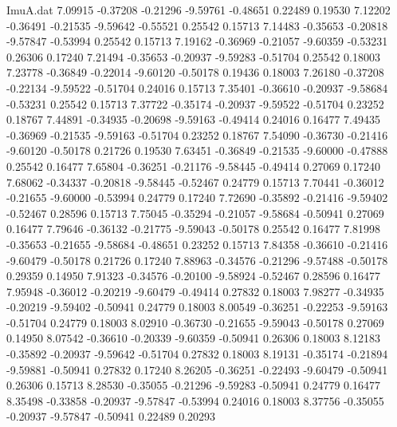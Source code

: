 \begin{filecontents}{ImuA.dat}
   7.09915   -0.37208   -0.21296   -9.59761   -0.48651    0.22489    0.19530
   7.12202   -0.36491   -0.21535   -9.59642   -0.55521    0.25542    0.15713
   7.14483   -0.35653   -0.20818   -9.57847   -0.53994    0.25542    0.15713
   7.19162   -0.36969   -0.21057   -9.60359   -0.53231    0.26306    0.17240
   7.21494   -0.35653   -0.20937   -9.59283   -0.51704    0.25542    0.18003
   7.23778   -0.36849   -0.22014   -9.60120   -0.50178    0.19436    0.18003
   7.26180   -0.37208   -0.22134   -9.59522   -0.51704    0.24016    0.15713
   7.35401   -0.36610   -0.20937   -9.58684   -0.53231    0.25542    0.15713
   7.37722   -0.35174   -0.20937   -9.59522   -0.51704    0.23252    0.18767
   7.44891   -0.34935   -0.20698   -9.59163   -0.49414    0.24016    0.16477
   7.49435   -0.36969   -0.21535   -9.59163   -0.51704    0.23252    0.18767
   7.54090   -0.36730   -0.21416   -9.60120   -0.50178    0.21726    0.19530
   7.63451   -0.36849   -0.21535   -9.60000   -0.47888    0.25542    0.16477
   7.65804   -0.36251   -0.21176   -9.58445   -0.49414    0.27069    0.17240
   7.68062   -0.34337   -0.20818   -9.58445   -0.52467    0.24779    0.15713
   7.70441   -0.36012   -0.21655   -9.60000   -0.53994    0.24779    0.17240
   7.72690   -0.35892   -0.21416   -9.59402   -0.52467    0.28596    0.15713
   7.75045   -0.35294   -0.21057   -9.58684   -0.50941    0.27069    0.16477
   7.79646   -0.36132   -0.21775   -9.59043   -0.50178    0.25542    0.16477
   7.81998   -0.35653   -0.21655   -9.58684   -0.48651    0.23252    0.15713
   7.84358   -0.36610   -0.21416   -9.60479   -0.50178    0.21726    0.17240
   7.88963   -0.34576   -0.21296   -9.57488   -0.50178    0.29359    0.14950
   7.91323   -0.34576   -0.20100   -9.58924   -0.52467    0.28596    0.16477
   7.95948   -0.36012   -0.20219   -9.60479   -0.49414    0.27832    0.18003
   7.98277   -0.34935   -0.20219   -9.59402   -0.50941    0.24779    0.18003
   8.00549   -0.36251   -0.22253   -9.59163   -0.51704    0.24779    0.18003
   8.02910   -0.36730   -0.21655   -9.59043   -0.50178    0.27069    0.14950
   8.07542   -0.36610   -0.20339   -9.60359   -0.50941    0.26306    0.18003
   8.12183   -0.35892   -0.20937   -9.59642   -0.51704    0.27832    0.18003
   8.19131   -0.35174   -0.21894   -9.59881   -0.50941    0.27832    0.17240
   8.26205   -0.36251   -0.22493   -9.60479   -0.50941    0.26306    0.15713
   8.28530   -0.35055   -0.21296   -9.59283   -0.50941    0.24779    0.16477
   8.35498   -0.33858   -0.20937   -9.57847   -0.53994    0.24016    0.18003
   8.37756   -0.35055   -0.20937   -9.57847   -0.50941    0.22489    0.20293

\end{filecontents}
